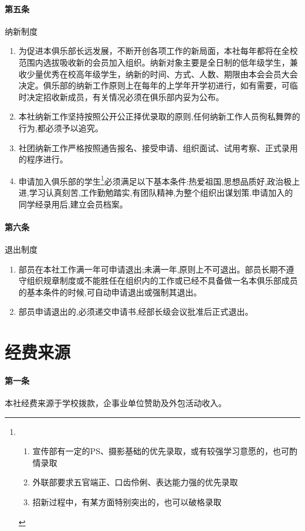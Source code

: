 \documentclass{club}
\begin{document}
\paragraph{第五条} 纳新制度
\begin{enumerate}
	\item 为促进本俱乐部长远发展，不断开创各项工作的新局面，本社每年都将在全校范围内选拔吸收新的会员加入组织。纳新对象主要是全日制的低年级学生，兼收少量优秀在校高年级学生，纳新的时间、方式、人数、期限由本会会员大会决定。俱乐部的纳新工作原则上在每年的上学年开学初进行，如有需要，可临时决定招收新成员，有关情况必须在俱乐部内妥为公布。
	\item 本社纳新工作坚持按照公开公正择优录取的原则,任何纳新工作人员徇私舞弊的行为,都必须予以追究。
	\item 社团纳新工作严格按照通告报名、接受申请、组织面试、试用考察、正式录用的程序进行。
	\item 申请加入俱乐部的学生\footnote{
		      \begin{enumerate}
			      \item 宣传部有一定的PS、摄影基础的优先录取，或有较强学习意愿的，也可酌情录取
			      \item 外联部要求五官端正、口齿伶俐、表达能力强的优先录取
			      \item 招新过程中，有某方面特别突出的，也可以破格录取
		      \end{enumerate}}必须满足以下基本条件:热爱祖国,思想品质好,政治极上进,学习认真刻苦,工作勤勉踏实,有团队精神,为整个组织出谋划策.申请加入的同学经录用后,建立会员档案。
\end{enumerate}

\paragraph{第六条} 退出制度
\begin{enumerate}
	\item 部员在本社工作满一年可申请退出;未满一年,原则上不可退出。部员长期不遵守组织规章制度或不能胜任在组织内的工作或已经不具备做一名本俱乐部成员的基本条件的时候,可自动申请退出或强制其退出。
	\item 部员申请退出的,必须递交申请书,经部长级会议批准后正式退出。
\end{enumerate}

\section{经费来源}

\paragraph{第一条} 本社经费来源于学校拨款，企事业单位赞助及外包活动收入。
\end{document}
